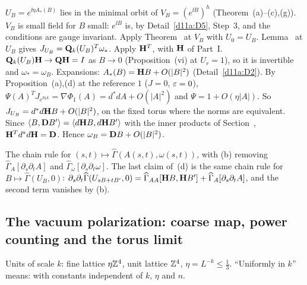 \begin{detail}
\begin{step}[(c)]
$U_B=e^{\ii\eta A_*(B)}$ lies in the minimal orbit of $V_B=(e^{\ii B})^h$ (Theorem~(a)--(c),(g)). $V_B$ is small field for $B$ small: $e^{\ii B}$ is, by Detail~\ref{d11a:D5}, Step~3, and the conditions are gauge invariant. Apply Theorem~ at $V_B$ with $U_0=U_B$. Lemma~ at $U_B$ gives $J_{U_B}=\mathbf Q_k(U_B)^T\omega_*$. Apply $\mathbf H^T$, with $\mathbf H$ of Part~I. $\mathbf Q_k(U_B)\mathbf H\to\mathbf Q\mathbf H=I$ as $B\to0$ (Proposition~(vi) at $U_r=1$), so it is invertible and $\omega_*=\omega_B$. Expansions: $A_*(B)=\mathbf H B+O(|B|^2)$ (Detail~\ref{d11a:D2}). By Proposition~(a),(d) at the reference $1$ ($J=0$, $\varepsilon=0$), $\Psi(A)^TJ_{e^{\ii\eta A}}=\nabla\Phi_1(A)=d^*dA+O(|A|^2)$ and $\Psi=1+O(\eta|A|)$. So $J_{U_B}=d^*d\mathbf H B+O(|B|^2)$, on the fixed torus where the norms are equivalent. Since $\langle B,\mathbf D B'\rangle=\langle d\mathbf H B,d\mathbf H B'\rangle$ with the inner products of Section~, $\mathbf H^Td^*d\mathbf H=\mathbf D$. Hence $\omega_B=\mathbf D B+O(|B|^2)$.
\end{step}
\begin{step}[(d)]
The chain rule for $(s,t)\mapsto\widehat\Gamma(A(s,t),\omega(s,t))$, with (b) removing $\widehat\Gamma_A[\partial_s\partial_tA]$ and $\widehat\Gamma_\omega[\partial_s\partial_t\omega]$. The last claim of~(d) is the same chain rule for $B\mapsto\widehat\Gamma(U_B,0)$: $\partial_s\partial_t\widehat\Gamma(U_{sB+tB'},0)=\widehat\Gamma_{AA}[\mathbf H B,\mathbf H B']+\widehat\Gamma_A[\partial_s\partial_tA]$, and the second term vanishes by (b).
\end{step}
\end{detail}

\subsection{The vacuum polarization: coarse map, power counting and the torus limit}\label{d11a:vacpol}

Units of scale $k$: fine lattice $\eta\mathbb Z^4$, unit lattice $\mathbb Z^4$, $\eta=L^{-k}\le\frac13$. ``Uniformly in $k$'' means: with constants independent of $k$, $\eta$ and $n$.

